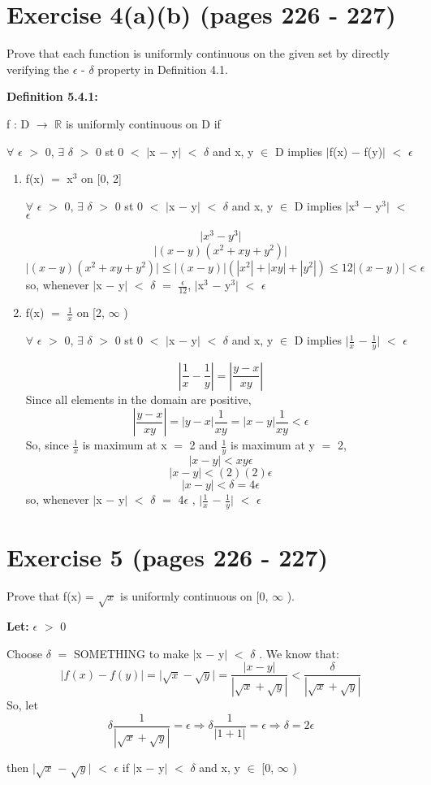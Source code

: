\documentclass{article}
\newcommand{\mt}[1]{\ensuremath{#1}}
\newcommand\bsc[2][\DefaultOpt]{%
  \def\DefaultOpt{#2}%
  \section[#1]{#2}%
}
\newcommand{\balist}{\begin{enumerate}[label=\alph*.]}
\newcommand{\elist}{\end{enumerate}}
\newcommand{\lt}[1]{\textbf{Let: } #1}
\newcommand{\br}{\mt{\mathbb{R}} }       %
\newcommand{\ep}{\mt{\epsilon} }         %
\newcommand{\fa}{\mt{\forall} }          %
\newcommand{\dta}{\mt{\delta} }
\newcommand{\mem}{\mt{\in} }
\newcommand{\exs}{\mt{\exists} }
\newcommand{\lra}{ \mt{\longrightarrow} } %
\newcommand{\rar}{ \mt{\Rightarrow} }     %
\newcommand{\av}[1]{\mt{|}#1\mt{|}}  %
\newcommand{\ms}{\mt{-} }
\newcommand{\ls}{\mt{<} }
\newcommand{\gr}{\mt{>} }
\newcommand{\lse}{\mt{\leq} }
\newcommand{\eql}{\mt{=} }
\newcommand{\uf}[2]{#1\mt{^{#2}}}
\newcommand{\frc}[2]{\mt{\frac{#1}{#2}}}
\newcommand{\eqn}[1]{\[#1\]}
\newcommand{\infy}{\mt{\infty} }
\begin{document}
\bsc{Exercise 4(a)(b) (pages 226 - 227)}{
Prove that each function is uniformly continuous on the given set by directly verifying the \ep - \dta property in Definition 4.1.

\textbf{Definition 5.4.1:}

f : D \lra \br is uniformly continuous on D if

\fa \ep \gr 0, \exs \dta \gr 0 st 0 \ls \av{x \ms y} \ls \dta and x, y \mem D implies \av{f(x) \ms f(y)} \ls \ep

\balist
\item f(x) \eql \uf{x}{3} on [0, 2]

\fa \ep \gr 0, \exs \dta \gr 0 st 0 \ls \av{x \ms y} \ls \dta and x, y \mem D implies \av{\uf{x}{3} \ms \uf{y}{3}} \ls \ep

\eqn{\av{\uf{x}{3} \ms \uf{y}{3}}}
\eqn{\av{(x - y)(x^2 + xy + y^2)}}
\eqn{\av{(x - y)(x^2 + xy + y^2)} \lse |(x - y)|(|x^2| + |xy| + |y^2|) \lse 12|(x - y)| \ls \ep}
so, whenever \av{x \ms y} \ls \dta \eql \frc{\ep}{12}, \av{\uf{x}{3} \ms \uf{y}{3}} \ls \ep

\item f(x) \eql \frc{1}{x} on [2, \infy)

\fa \ep \gr 0, \exs \dta \gr 0 st 0 \ls \av{x \ms y} \ls \dta and x, y \mem D implies \av{\frc{1}{x} \ms \frc{1}{y}} \ls \ep

\eqn{|\frac{1}{x} - \frac{1}{y}| = |\frac{y - x}{xy}|}
Since all elements in the domain are positive,
\eqn{|\frac{y - x}{xy}| = |y - x| \frac{1}{xy} = |x - y| \frac{1}{xy} \ls \ep}
So, since \frc{1}{x} is maximum at x \eql 2 and \frc{1}{y} is maximum at y \eql 2,
\eqn{|x - y| \ls xy\ep}
\eqn{|x - y| \ls (2)(2)\ep}
\eqn{|x - y| \ls \dta \eql 4\ep}
so, whenever \av{x \ms y} \ls \dta \eql 4\ep, \av{\frc{1}{x} \ms \frc{1}{y}} \ls \ep


\elist

}
\bsc{Exercise 5 (pages 226 - 227)}{

Prove that f(x) = $\sqrt{x}$ is uniformly continuous on [0, \infy).

\lt{\ep \gr 0}

Choose \dta \eql SOMETHING to make \av{x \ms y} \ls \dta. We know that:
\eqn{\av{f(x) - f(y)} = \av{\sqrt{x} - \sqrt{y}} = \frac{\av{x - y}}{|\sqrt{x} + \sqrt{y}|} \ls \frac{\dta}{|\sqrt{x} + \sqrt{y}|}}
So, let
\eqn{\dta \frac{1}{|\sqrt{x} + \sqrt{y}|} = \epsilon \rar \dta \frac{1}{|1 + 1|} = \epsilon \rar \dta = 2\epsilon}

then \av{$\sqrt{x}$ \ms $\sqrt{y}$} \ls \ep if \av{x \ms y} \ls \dta and x, y \mem [0, \infy)

}
\end{document}
